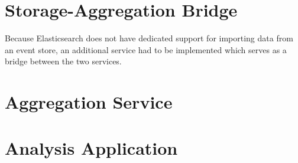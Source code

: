 \section{Storage-Aggregation Bridge}
\label{sec:implementation:bridge}

Because Elasticsearch does not have dedicated support for importing data from an event store, an additional service had to be implemented which serves as a bridge between the two services.

\section{Aggregation Service}
\label{sec:implementation:aggregation}

\section{Analysis Application}
\label{sec:implementation:analysis}

